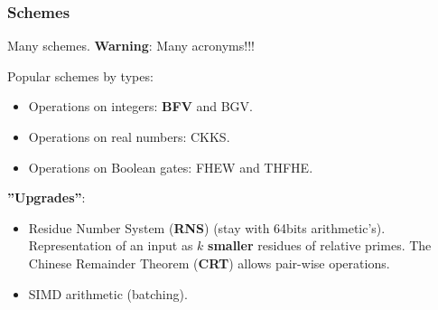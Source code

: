 \documentclass[10pt]{beamer}
\begin{document}
\begin{frame}
    \frametitle{Schemes}

    Many schemes. \textbf{Warning}: Many acronyms!!!

    Popular schemes by types:
    \begin{itemize}\vspace{-0.2cm}
        \item Operations on integers: \textbf{BFV} and BGV.\vspace{-0.2cm}
\pause
        \item Operations on real numbers: CKKS.\vspace{-0.2cm}
        \item Operations on Boolean gates: FHEW and THFHE.
    \end{itemize}

\pause
    \textbf{''Upgrades''}:
\begin{itemize}\vspace{-0.2cm}
    \item Residue Number System (\textbf{RNS}) (stay with 64bits arithmetic's).
        Representation of an input as $k$ \textbf{smaller}  residues of relative primes.
        The Chinese Remainder Theorem (\textbf{CRT}) allows pair-wise operations.
 \vspace{-0.2cm}
\pause
   \item SIMD arithmetic (batching).
\end{itemize}


\end{frame}

\end{document}
